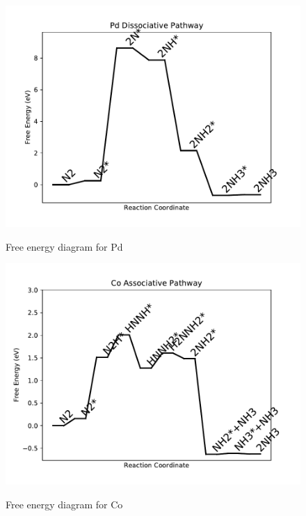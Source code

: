 \documentclass{article}
\begin{document}
\begin{figure}
\includegraphics[width=1\linewidth]{data/plots/Pd_dissociative.pdf}
\label{fig:Pd_dissociative}
\caption{Free energy diagram for Pd}
\end{figure}

\clearpage
\begin{figure}
\includegraphics[width=1\linewidth]{data/plots/Co_associative.pdf}
\label{fig:Co_associative}
\caption{Free energy diagram for Co}
\end{figure}
\end{document}
